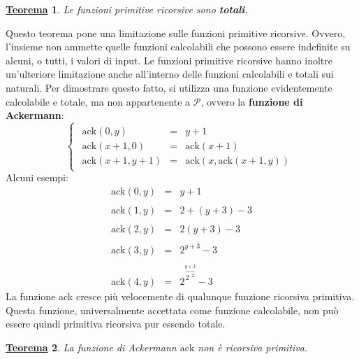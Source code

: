 \documentclass[a4paper]{article}
\newtheorem{theorem}{\textcolor{Red3}{\underline{Teorema}}}
\begin{document}
	\begin{theorem}
		Le funzioni primitive ricorsive sono \textbf{totali}.
	\end{theorem}
	\noindent
	Questo teorema pone una limitazione sulle funzioni primitive ricorsive. Ovvero, l'insieme non ammette quelle funzioni calcolabili che possono essere indefinite su alcuni, o tutti, i valori di input. Le funzioni primitive ricorsive hanno inoltre un'ulteriore limitazione anche all'interno delle funzioni calcolabili e totali sui naturali. Per dimostrare questo fatto, si utilizza una funzione evidentemente calcolabile e totale, ma non appartenente a $\mathcal{P}$, ovvero la \textbf{funzione di Ackermann}:
	\begin{equation*}
		\begin{cases}
			\begin{array}{lll}
				\mathrm{ack}\left(0, y\right) 	& = & y+1 \\
				\mathrm{ack}\left(x+1, 0\right) & = & \mathrm{ack}\left(x+1\right) \\
				\mathrm{ack}\left(x+1, y+1\right) & = & \mathrm{ack}\left(x, \mathrm{ack}\left(x+1, y\right)\right)
			\end{array}
		\end{cases}
	\end{equation*}
	Alcuni esempi:
	\begin{equation*}
		\begin{array}{lll}
			\mathrm{ack}\left(0,y\right) & = & y+1 \\
			&& \\
			\mathrm{ack}\left(1,y\right) & = & 2+\left(y+3\right)-3 \\
			&& \\
			\mathrm{ack}\left(2,y\right) & = & 2\left(y+3\right)-3 \\
			&& \\
			\mathrm{ack}\left(3,y\right) & = & 2^{y+3} - 3 \\
			&& \\
			\mathrm{ack}\left(4,y\right) & = & 2^{\overbrace{{2^{.. 2}}}^{y+3}} - 3
		\end{array}
	\end{equation*}
	La funzione ack cresce più velocemente di qualunque funzione ricorsiva primitiva. Questa funzione, universalmente accettata come funzione calcolabile, non può essere quindi primitiva ricorsiva pur essendo totale.
	\begin{theorem}
		La funzione di Ackermann $\mathrm{ack}$ non è ricorsiva primitiva.
	\end{theorem}\newpage
	
\end{document}

